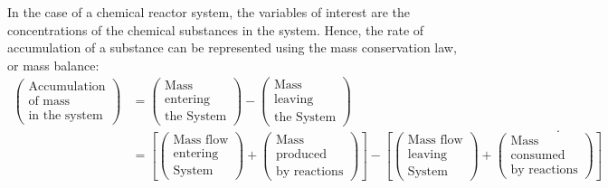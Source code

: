 \documentclass[a4paper,11pt]{book}
\numberwithin{figure}{chapter}
\numberwithin{equation}{chapter}
\numberwithin{table}{chapter}
\theoremstyle{definition}
\begin{document}
In the case of a chemical reactor system, the variables of interest are the concentrations of the chemical substances in the system. Hence, the rate of accumulation of a substance can be represented using the mass conservation law, or mass balance:
\begin{equation} \label{eq:massCons02}
\begin{split}
    \begin{pmatrix}
        \text{Accumulation} \\ \text{of mass} \\ \text{in the system}
    \end{pmatrix} &= 
    \begin{pmatrix}
        \text{Mass} \\ \text{entering} \\ \text{the System}
    \end{pmatrix} - \begin{pmatrix}
        \text{Mass} \\ \text{leaving} \\ \text{the System}
    \end{pmatrix} \\
    &= \left[ \begin{pmatrix}
        \text{Mass flow} \\ \text{entering} \\ \text{System}
    \end{pmatrix} + \begin{pmatrix}
        \text{Mass} \\  \text{produced} \\ \text{by reactions}
    \end{pmatrix} \right] - \left[ \begin{pmatrix}
        \text{Mass flow} \\ \text{leaving} \\ \text{System}
    \end{pmatrix} + \begin{pmatrix}
        \text{Mass} \\ \text{consumed} \\ \text{by reactions}
    \end{pmatrix} \right]
\end{split}
.\end{equation}
\end{document}
